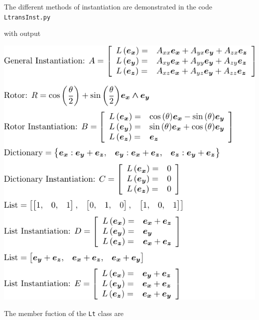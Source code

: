 \documentclass[12pt]{report}
\newcommand{\T}[1]{\texttt{#1}}
\newcommand{\includecode}[1]{}
\begin{document}
The different methods of instantiation are demonstrated in the code \T{LtransInst.py}
\includecode{python/LtransInst.py}
with output
\begin{center}
	\includegraphics[scale=1]{python/LtransInst.pdf}
\end{center}
The member fuction of the \T{Lt} class are
\end{document}
